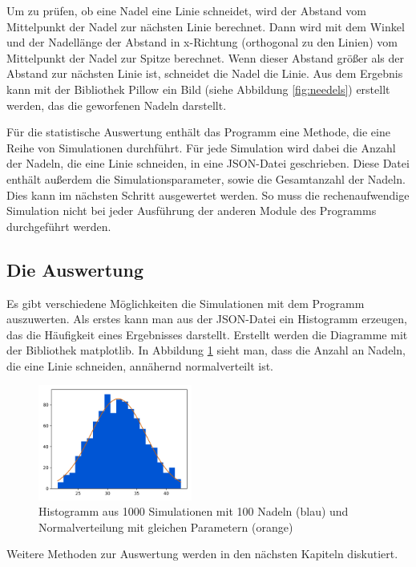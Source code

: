 \documentclass[10pt,twocolumn]{scrartcl}
\begin{document}
		Um zu prüfen, ob eine Nadel eine Linie schneidet, wird der Abstand vom Mittelpunkt der Nadel zur nächsten Linie berechnet. Dann wird mit dem Winkel und der Nadellänge der Abstand in x-Richtung (orthogonal zu den Linien) vom Mittelpunkt der Nadel zur Spitze berechnet. Wenn dieser Abstand größer als der Abstand zur nächsten Linie ist, schneidet die Nadel die Linie.
		Aus dem Ergebnis kann mit der Bibliothek Pillow\cite{Pillow} ein Bild (siehe Abbildung \ref{fig:needels}) erstellt werden, das die geworfenen Nadeln darstellt.

		Für die statistische Auswertung enthält das Programm eine Methode, die eine Reihe von Simulationen durchführt. Für jede Simulation wird dabei die Anzahl der Nadeln, die eine Linie schneiden, in eine JSON-Datei geschrieben. Diese Datei enthält außerdem die Simulationsparameter, sowie die Gesamtanzahl der Nadeln. Dies kann im nächsten Schritt ausgewertet werden. So muss die rechenaufwendige Simulation nicht bei jeder Ausführung der anderen Module des Programms durchgeführt werden.

	\subsection{Die Auswertung}
		Es gibt verschiedene Möglichkeiten die Simulationen mit dem Programm auszuwerten. Als erstes kann man aus der JSON-Datei ein Histogramm erzeugen, das die Häufigkeit eines Ergebnisses darstellt. Erstellt werden die Diagramme mit der Bibliothek matplotlib\cite{matplotlib}. 
		In Abbildung \ref{fig:hist} sieht man, dass die Anzahl an Nadeln, die eine Linie schneiden, annähernd normalverteilt ist.

		\begin{figure}[htb]
			\centering
			\includegraphics[width=0.45\textwidth]{images/histogram_1000_no_interval_3.png}
			\caption{Histogramm aus 1000 Simulationen mit 100 Nadeln (blau) und Normalverteilung mit gleichen Parametern (orange)}
			\label{fig:hist}
		\end{figure}
		
		Weitere Methoden zur Auswertung werden in den nächsten Kapiteln diskutiert.
\end{document}
